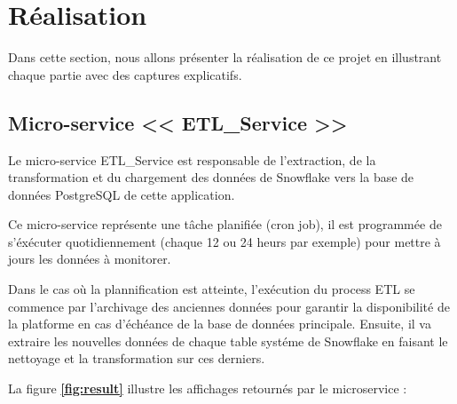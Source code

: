 \section{Réalisation}
\par Dans cette section, nous allons présenter la réalisation de ce projet en illustrant chaque partie avec des captures explicatifs.
\subsection{Micro-service << ETL\_Service >>}
\par Le micro-service ETL\_Service est responsable de l'extraction, de la transformation et du chargement des données de Snowflake vers la base de données PostgreSQL de cette application.
\par Ce micro-service représente une tâche planifiée (cron job), il est programmée de s'éxécuter quotidiennement (chaque 12 ou 24 heurs par exemple) pour mettre à jours les données à monitorer. 
\par Dans le cas où la plannification est atteinte, l'exécution du process ETL se commence par l'archivage des anciennes données pour garantir la disponibilité de la platforme en cas d'échéance de la base de données principale.  
Ensuite, il va extraire les nouvelles données de chaque table systéme de Snowflake en faisant le nettoyage et la transformation sur ces derniers. 
\par  La figure \textbf{\ref{fig:result}} illustre les affichages retournés par le microservice : 
